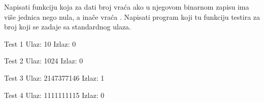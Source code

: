 
\begin{Exercise}[label=207]
Napisati funkciju  koja za dati broj  vraća  ako u njegovom binarnom zapisu ima više jednica nego nula, a inače vraća .  Napisati program koji tu funkciju testira za broj koji se zadaje sa standardnog ulaza.

\begin{minitest}
\begin{test}{Test 1}
Ulaz:   10
Izlaz:  0 
\end{test}
\end{minitest}
\begin{minitest}
\begin{test}{Test 2}
Ulaz:   1024
Izlaz:  0 
\end{test}
\end{minitest}
\begin{minitest}
\begin{test}{Test 3}
Ulaz:   2147377146
Izlaz:  1 
\end{test}
\end{minitest}

\begin{minitest}
\begin{test}{Test 4}
Ulaz:   1111111115
Izlaz:  0 
\end{test}
\end{minitest}

\end{Exercise}
\begin{Answer}[ref=207]
\end{Answer}

